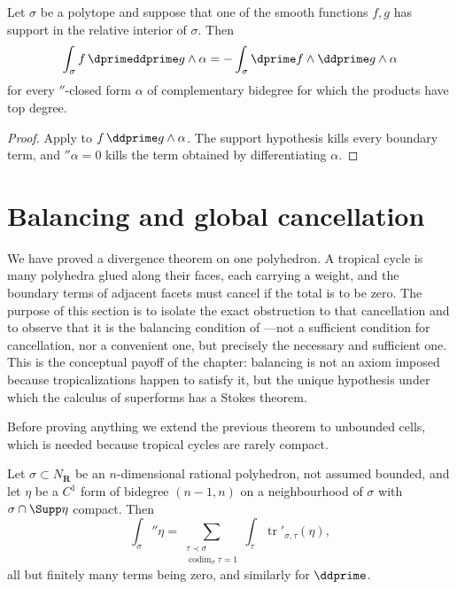 \begin{corollary}
\label{cor:polyhedral-integration-by-parts}
Let $\sigma$ be a polytope and suppose that one of the smooth functions
$f,g$ has support in the relative interior of $\sigma$. Then
\[
 \int_\sigma f\,\dprimeddprime g\wedge\alpha
 =-\int_\sigma \dprime f\wedge\ddprime g\wedge\alpha
\]
for every $\dprime$-closed form $\alpha$ of complementary bidegree for which
the products have top degree.
\end{corollary}
\begin{proof}
Apply  to
$f\,\ddprime g\wedge\alpha$.  The support hypothesis kills every boundary
term, and $\dprime\alpha=0$ kills the term obtained by differentiating
$\alpha$.
\end{proof}

\section{Balancing and global cancellation}
\label{sec:ch11-balancing}

We have proved a divergence theorem on one polyhedron.  A tropical cycle is
many polyhedra glued along their faces, each carrying a weight, and the
boundary terms of adjacent facets must cancel if the total is to be zero.
The purpose of this section is to isolate the exact obstruction to that
cancellation and to observe that it is the balancing condition of
---not a sufficient condition for cancellation,
nor a convenient one, but precisely the necessary and sufficient one.  This
is the conceptual payoff of the chapter: balancing is not an axiom imposed
because tropicalizations happen to satisfy it, but the unique hypothesis
under which the calculus of superforms has a Stokes theorem.

Before proving anything we extend the previous theorem to unbounded cells,
which is needed because tropical cycles are rarely compact.

\begin{corollary}
\label{cor:ch11-stokes-unbounded}
Let $\sigma\subset N_{\mathbf R}$ be an $n$-dimensional rational polyhedron,
not assumed bounded, and let $\eta$ be a $C^1$ form of bidegree $(n-1,n)$
on a
neighbourhood of $\sigma$ with $\sigma\cap\Supp\eta$ compact.  Then
\[
 \int_\sigma\dprime\eta
 =\sum_{\substack{\tau\prec\sigma\\ \operatorname{codim}_\sigma\tau=1}}
   \int_\tau\operatorname{tr}'_{\sigma,\tau}(\eta),
\]
all but finitely many terms being zero, and similarly for $\ddprime$.
\end{corollary}

